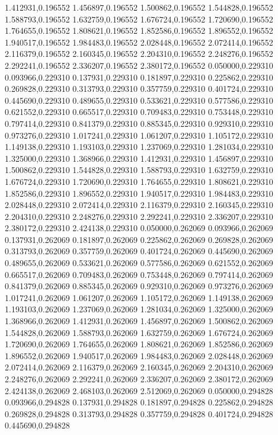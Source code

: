 1.412931,0.196552
1.456897,0.196552
1.500862,0.196552
1.544828,0.196552
1.588793,0.196552
1.632759,0.196552
1.676724,0.196552
1.720690,0.196552
1.764655,0.196552
1.808621,0.196552
1.852586,0.196552
1.896552,0.196552
1.940517,0.196552
1.984483,0.196552
2.028448,0.196552
2.072414,0.196552
2.116379,0.196552
2.160345,0.196552
2.204310,0.196552
2.248276,0.196552
2.292241,0.196552
2.336207,0.196552
2.380172,0.196552
0.050000,0.229310
0.093966,0.229310
0.137931,0.229310
0.181897,0.229310
0.225862,0.229310
0.269828,0.229310
0.313793,0.229310
0.357759,0.229310
0.401724,0.229310
0.445690,0.229310
0.489655,0.229310
0.533621,0.229310
0.577586,0.229310
0.621552,0.229310
0.665517,0.229310
0.709483,0.229310
0.753448,0.229310
0.797414,0.229310
0.841379,0.229310
0.885345,0.229310
0.929310,0.229310
0.973276,0.229310
1.017241,0.229310
1.061207,0.229310
1.105172,0.229310
1.149138,0.229310
1.193103,0.229310
1.237069,0.229310
1.281034,0.229310
1.325000,0.229310
1.368966,0.229310
1.412931,0.229310
1.456897,0.229310
1.500862,0.229310
1.544828,0.229310
1.588793,0.229310
1.632759,0.229310
1.676724,0.229310
1.720690,0.229310
1.764655,0.229310
1.808621,0.229310
1.852586,0.229310
1.896552,0.229310
1.940517,0.229310
1.984483,0.229310
2.028448,0.229310
2.072414,0.229310
2.116379,0.229310
2.160345,0.229310
2.204310,0.229310
2.248276,0.229310
2.292241,0.229310
2.336207,0.229310
2.380172,0.229310
2.424138,0.229310
0.050000,0.262069
0.093966,0.262069
0.137931,0.262069
0.181897,0.262069
0.225862,0.262069
0.269828,0.262069
0.313793,0.262069
0.357759,0.262069
0.401724,0.262069
0.445690,0.262069
0.489655,0.262069
0.533621,0.262069
0.577586,0.262069
0.621552,0.262069
0.665517,0.262069
0.709483,0.262069
0.753448,0.262069
0.797414,0.262069
0.841379,0.262069
0.885345,0.262069
0.929310,0.262069
0.973276,0.262069
1.017241,0.262069
1.061207,0.262069
1.105172,0.262069
1.149138,0.262069
1.193103,0.262069
1.237069,0.262069
1.281034,0.262069
1.325000,0.262069
1.368966,0.262069
1.412931,0.262069
1.456897,0.262069
1.500862,0.262069
1.544828,0.262069
1.588793,0.262069
1.632759,0.262069
1.676724,0.262069
1.720690,0.262069
1.764655,0.262069
1.808621,0.262069
1.852586,0.262069
1.896552,0.262069
1.940517,0.262069
1.984483,0.262069
2.028448,0.262069
2.072414,0.262069
2.116379,0.262069
2.160345,0.262069
2.204310,0.262069
2.248276,0.262069
2.292241,0.262069
2.336207,0.262069
2.380172,0.262069
2.424138,0.262069
2.468103,0.262069
2.512069,0.262069
0.050000,0.294828
0.093966,0.294828
0.137931,0.294828
0.181897,0.294828
0.225862,0.294828
0.269828,0.294828
0.313793,0.294828
0.357759,0.294828
0.401724,0.294828
0.445690,0.294828
